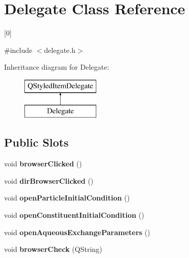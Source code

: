 \hypertarget{class_delegate}{}\section{Delegate Class Reference}
\label{class_delegate}


\mbox{[}0\mbox{]}  




{\ttfamily \#include $<$delegate.\+h$>$}

Inheritance diagram for Delegate\+:\begin{figure}[H]
\begin{center}
\leavevmode
\includegraphics[height=2.000000cm]{class_delegate}
\end{center}
\end{figure}
\subsection*{Public Slots}
\begin{DoxyCompactItemize}
\item 
\mbox{\label{class_delegate_aa524b01d54663f4584f3da0e5294c75e}} 
void {\bfseries browser\+Clicked} ()
\item 
\mbox{\label{class_delegate_a57c04442525f3255891d711c2a41b749}} 
void {\bfseries dir\+Browser\+Clicked} ()
\item 
\mbox{\label{class_delegate_a9d57706b5e4327d40d044c02b51034be}} 
void {\bfseries open\+Particle\+Initial\+Condition} ()
\item 
\mbox{\label{class_delegate_a6001892e2b904bbc234884a33161a8f1}} 
void {\bfseries open\+Constituent\+Initial\+Condition} ()
\item 
\mbox{\label{class_delegate_af8eac52365ac5ae676c3720e631340bb}} 
void {\bfseries open\+Aqueous\+Exchange\+Parameters} ()
\item 
\mbox{\label{class_delegate_ac5a020ef6f4be7d8c54730f61f51126b}} 
void {\bfseries browser\+Check} (Q\+String)
\end{DoxyCompactItemize}

